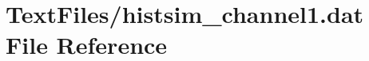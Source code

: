 \hypertarget{TextFiles_2histsim__channel1_8dat}{}\section{Text\+Files/histsim\+\_\+channel1.dat File Reference}
\label{TextFiles_2histsim__channel1_8dat}
